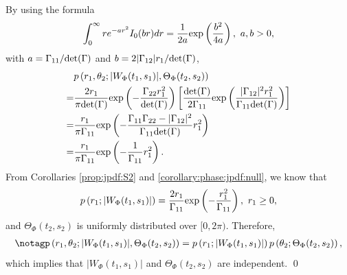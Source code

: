 \documentclass{amsart}
\begin{document}
By using the formula \cite[p. 713]{gradshteyn2014table}
\begin{align*}
\int_{0}^{\infty} r e^{-ar^2}I_{0}(br)dr = \frac{1}{2a}\textup{exp}\left(\frac{b^2}{4a}\right),\ a,b>0,
\end{align*}
with $a =\Gamma_{11}/\textup{det}(\Gamma)$ and $b=2|\Gamma_{12}|r_{1}/\textup{det}(\Gamma)$,
\begin{align}\notag%
&p\left(r_{1},\theta_{2};
|W_{\Phi}(t_{1},s_{1})|,\Theta_{\Phi}(t_{2},s_{2})\right)
\\\notag=&\frac{2r_{1}}{\pi\textup{det}(\Gamma)}\textup{exp}\left(-\frac{\Gamma_{22}r_{1}^2}{\textup{det}(\Gamma)}\right)
\left[\frac{\textup{det}(\Gamma)}{2\Gamma_{11}}\textup{exp}\left(\frac{|\Gamma_{12}|^2r_{1}^2}{\Gamma_{11}\textup{det}(\Gamma)}\right)
\right]
\\\notag=&\frac{r_{1}}{\pi\Gamma_{11}}
\textup{exp}\left(-\frac{\Gamma_{11}\Gamma_{22}-|\Gamma_{12}|^2}
{\Gamma_{11}\textup{det}(\Gamma)}r_{1}^{2}\right)
\\\notag=&
\frac{r_{1}}{\pi\Gamma_{11}}
\textup{exp}\left(-\frac{1}
{\Gamma_{11}}r_{1}^{2}\right).
\end{align}
From Corollaries \ref{prop:jpdf:S2} and \ref{corollary:phase:jpdf:null}, we know that
\begin{align}\notag
p\left(r_{1};
|W_{\Phi}(t_{1},s_{1})|\right)=\frac{2r_{1}}{\Gamma_{11}}\textup{exp}\left(-\frac{r_{1}^{2}}{\Gamma_{11}}\right),\ r_{1}\geq 0,
\end{align}
and $\Theta_{\Phi}(t_{2},s_{2})$ is uniformly distributed over $[0,2\pi).$
Therefore,
\begin{align}\notag%
p\left(r_{1},\theta_{2};
|W_{\Phi}(t_{1},s_{1})|,\Theta_{\Phi}(t_{2},s_{2})\right)
=p\left(r_{1};
|W_{\Phi}(t_{1},s_{1})|\right)p\left(\theta_{2};
\Theta_{\Phi}(t_{2},s_{2})\right),
\end{align}
which implies that $|W_{\Phi}(t_{1},s_{1})|$ and $\Theta_{\Phi}(t_{2},s_{2})$ are independent.
\qed
\end{document}
